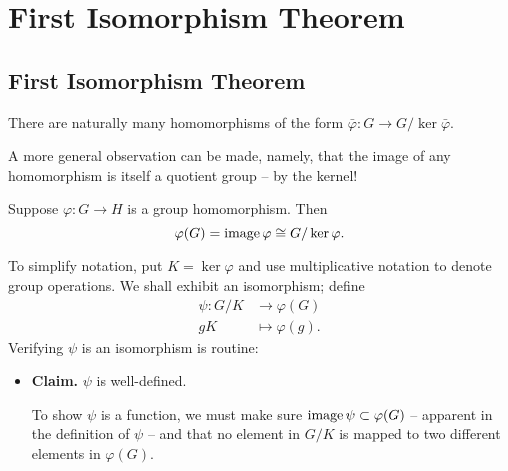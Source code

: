 \documentclass[../algebraNotesMSRI-UP2016.tex]{subfiles}
\begin{document}
\section[\S \thesection]{First Isomorphism Theorem}\label{sec:2p8firstIsomorphismTheorem}
\subsection[\subsecname]{First Isomorphism Theorem}
\begin{frame}[c]{\subsecname}
There are naturally many homomorphisms of the form $\bar{\varphi}:G\to G/\ker{\bar{\varphi}}$.  

\smallGap
A more general observation can be made, namely, that the image of any homomorphism is itself a quotient group -- by the kernel! 

\smallGap
\begin{thm}\label{thm:firstIsomorphismTheorem}
Suppose $\varphi: G\to H$ is a group homomorphism.  Then 
\[
\varphi(G)=\operatorname{image}{\varphi}\cong G/\ker{\varphi}.
\]
\end{thm}
\end{frame}

\begin{frame}
\bigProof
To simplify notation, put $K=\ker{\varphi}$ and use multiplicative notation to denote group operations.  We shall exhibit an isomorphism; define
\begin{align*}
\psi:G/K &\to \varphi(G) \\
gK &\mapsto \varphi(g).
\end{align*}
Verifying $\psi$ is an isomorphism is routine:
\begin{itemize}
\item \textbf{Claim.} $\psi$ is well-defined.

\smallGap
\pf To show $\psi$ is a function, we must make sure $\operatorname{image}{\psi}\subset \varphi(G)$ -- apparent in the definition of $\psi$ -- and that no element in $G/K$ is mapped to two different elements in $\varphi(G)$.
\end{itemize}
\end{frame}
\end{document}
